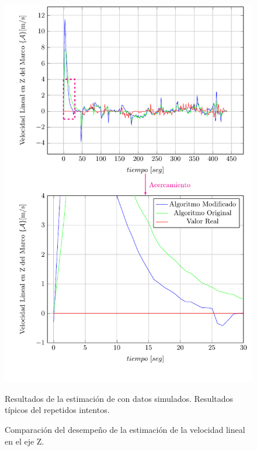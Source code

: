 \documentclass[10pt]{report}
\numberwithin{equation}{chapter}
\numberwithin{algorithm}{chapter}
\begin{document}
\begin{figure}
\begin{center}
\includegraphics[scale=0.8]
{PlotW.pdf}
\caption{Comparación del desempeño de la estimación de la velocidad lineal en el eje Z.}
\scriptsize{Resultados de la estimación de con datos simulados. Resultados típicos del repetidos intentos.}
\label{PlotW1}
\end{center}
\end{figure}
\newpage
\end{document}
